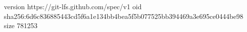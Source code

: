 version https://git-lfs.github.com/spec/v1
oid sha256:6d6c836885443cd5f6a1e134bb4bea5f5b077525bb394469a3e695ce0444be98
size 781253
